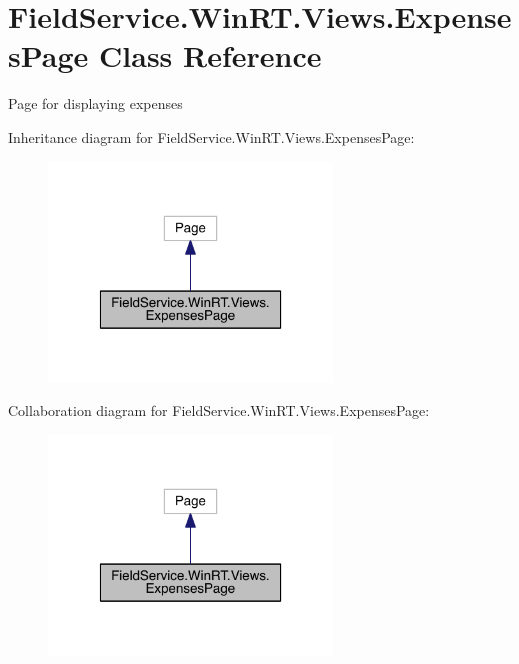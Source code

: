 \hypertarget{class_field_service_1_1_win_r_t_1_1_views_1_1_expenses_page}{\section{Field\+Service.\+Win\+R\+T.\+Views.\+Expenses\+Page Class Reference}
\label{class_field_service_1_1_win_r_t_1_1_views_1_1_expenses_page}
}


Page for displaying expenses  




Inheritance diagram for Field\+Service.\+Win\+R\+T.\+Views.\+Expenses\+Page\+:
\nopagebreak
\begin{figure}[H]
\begin{center}
\leavevmode
\includegraphics[width=214pt]{class_field_service_1_1_win_r_t_1_1_views_1_1_expenses_page__inherit__graph}
\end{center}
\end{figure}


Collaboration diagram for Field\+Service.\+Win\+R\+T.\+Views.\+Expenses\+Page\+:
\nopagebreak
\begin{figure}[H]
\begin{center}
\leavevmode
\includegraphics[width=214pt]{class_field_service_1_1_win_r_t_1_1_views_1_1_expenses_page__coll__graph}
\end{center}
\end{figure}
